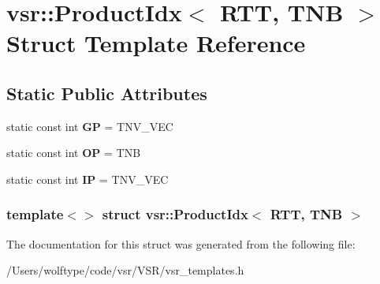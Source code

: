 \hypertarget{structvsr_1_1_product_idx_3_01_r_t_t_00_01_t_n_b_01_4}{\section{vsr\-:\-:Product\-Idx$<$ R\-T\-T, T\-N\-B $>$ Struct Template Reference}
\label{structvsr_1_1_product_idx_3_01_r_t_t_00_01_t_n_b_01_4}
}
\subsection*{Static Public Attributes}
\begin{DoxyCompactItemize}
\item 
\hypertarget{structvsr_1_1_product_idx_3_01_r_t_t_00_01_t_n_b_01_4_aff914b629650360c66bd253b430cda1f}{static const int {\bfseries G\-P} = T\-N\-V\-\_\-\-V\-E\-C}\label{structvsr_1_1_product_idx_3_01_r_t_t_00_01_t_n_b_01_4_aff914b629650360c66bd253b430cda1f}

\item 
\hypertarget{structvsr_1_1_product_idx_3_01_r_t_t_00_01_t_n_b_01_4_a956e46eb5f921c85c25fe0e274105cfe}{static const int {\bfseries O\-P} = T\-N\-B}\label{structvsr_1_1_product_idx_3_01_r_t_t_00_01_t_n_b_01_4_a956e46eb5f921c85c25fe0e274105cfe}

\item 
\hypertarget{structvsr_1_1_product_idx_3_01_r_t_t_00_01_t_n_b_01_4_af9d148303fae8b73de7496062be16674}{static const int {\bfseries I\-P} = T\-N\-V\-\_\-\-V\-E\-C}\label{structvsr_1_1_product_idx_3_01_r_t_t_00_01_t_n_b_01_4_af9d148303fae8b73de7496062be16674}

\end{DoxyCompactItemize}
\subsubsection*{template$<$$>$ struct vsr\-::\-Product\-Idx$<$ R\-T\-T, T\-N\-B $>$}



The documentation for this struct was generated from the following file\-:\begin{DoxyCompactItemize}
\item 
/\-Users/wolftype/code/vsr/\-V\-S\-R/vsr\-\_\-templates.\-h\end{DoxyCompactItemize}
